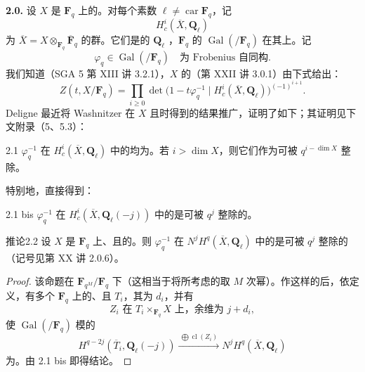 \textbf{2.0.} 设 $X$ 是 $\mathbf F_q$ 上的。对每个素数 $\ell\ne\operatorname{car}\mathbf F_q$，记
\[
 H^i_c(\overline X,\mathbf Q_\ell)
 \tag{2.0.1}
\]
为 $\overline X=X\otimes_{\mathbf F_q}\overline{\mathbf F}_q$ 的群。它们是的 $\mathbf Q_\ell$ ，$\mathbf F_q$ 的 $\operatorname{Gal}(/\mathbf F_q)$ 在其上。记
\[
 \varphi_q\in\operatorname{Gal}(/\mathbf F_q)
 \quad\text{为 Frobenius 自同构}.
 \tag{2.0.2}
\]
我们知道（SGA 5 第 XIII 讲 3.2.1），$X$ 的（第 XXII 讲 3.0.1）由下式给出：
\[
 Z(t,X/\mathbf F_q)=\prod_{i\geq0}
 \det\bigl(1-t\varphi_q^{-1}\mid H^i_c(\overline X,\mathbf Q_\ell)\bigr)^{(-1)^{i+1}}.
 \tag{2.0.3}
\]
Deligne 最近将 Washnitzer 在 $X$ 且时得到的结果推广，证明了如下；其证明见下文附录（5、5.3）：
\begin{SGAresult}{}{2.1}
$\varphi_q^{-1}$ 在 $H^i_c(\overline X,\mathbf Q_\ell)$ 中的均为。若 $i>\dim X$，则它们作为可被 $q^{i-\dim X}$ 整除。
\end{SGAresult}
特别地，直接得到：
\begin{SGAresult}{}{2.1 bis}
$\varphi_q^{-1}$ 在 $H^i_c(\overline X,\mathbf Q_\ell(-j))$ 中的是可被 $q^j$ 整除的。
\end{SGAresult}
\begin{SGAresult}{推论}{2.2}
设 $X$ 是 $\mathbf F_q$ 上、且的。则 $\varphi_q^{-1}$ 在 $N^jH^q(\overline X,\mathbf Q_\ell)$ 中的是可被 $q^j$ 整除的（记号见第 XX 讲 2.0.6）。
\end{SGAresult}
\begin{proof}
该命题在 $\mathbf F_{q^M}/\mathbf F_q$ 下（这相当于将所考虑的取 $M$ 次幂）。作这样的后，依定义，有多个 $\mathbf F_q$ 上的、且 $T_i$，其为 $d_i$，并有
\[
 Z_i\text{ 在 }T_i\times_{\mathbf F_q}X\text{ 上，余维为 }j+d_i,
\]
使 $\operatorname{Gal}(/\mathbf F_q)$ 模的
\[
 H^{q-2j}(\overline T_i,\mathbf Q_\ell(-j))
 \xrightarrow{\ \bigoplus\operatorname{cl}(Z_i)\ }
 N^jH^q(\overline X,\mathbf Q_\ell)
\]
为。由 2.1 bis 即得结论。
\end{proof}

